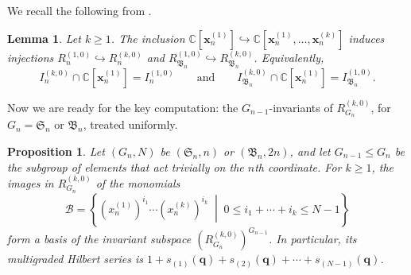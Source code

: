 \documentclass[12pt]{amsart}
\theoremstyle{plain}
\newtheorem{proposition}[theorem]{Proposition}
\newtheorem{lemma}[theorem]{Lemma}
\theoremstyle{definition}
\newcommand{\C}{\mathbb{C}}
\begin{document}
We recall the following from \cite[Lemma 3.1]{Lentfer-Supersymmetry}.
\begin{lemma}\label{lem:one-set-subring}
    Let $k \geq 1$.
    The inclusion $\C[\bm{x}^{(1)}_n] \hookrightarrow \C[\bm{x}^{(1)}_n, \ldots, \bm{x}^{(k)}_n]$ induces injections $R_n^{(1,0)} \hookrightarrow R_n^{(k,0)}$ and $R_{\mathfrak{B}_n}^{(1,0)} \hookrightarrow R_{\mathfrak{B}_n}^{(k,0)}$.
    Equivalently,
    \begin{equation}
        I_n^{(k,0)} \cap \C[\bm{x}^{(1)}_n] = I_n^{(1,0)}
        \qquad \text{and} \qquad
        I_{\mathfrak{B}_n}^{(k,0)} \cap \C[\bm{x}^{(1)}_n]
        = I_{\mathfrak{B}_n}^{(1,0)}.
    \end{equation}
\end{lemma}

Now we are ready for the key computation: the $G_{n-1}$-invariants of $R_{G_n}^{(k,0)}$, for $G_n = \mathfrak{S}_n$ or $\mathfrak{B}_n$, treated uniformly.

\begin{proposition}\label{prop:parabolic-invariants}
    Let $(G_n, N)$ be $(\mathfrak{S}_n, n)$ or $(\mathfrak{B}_n, 2n)$, and let $G_{n-1} \leq G_n$ be the subgroup of elements that act trivially on the $n$th coordinate.
    For $k \geq 1$, the images in $R_{G_n}^{(k,0)}$ of the monomials
    \begin{equation}\label{eq:basis}
        \mathcal{B} = \left\{(x^{(1)}_n)^{i_1}\cdots(x^{(k)}_n)^{i_k} \;\middle|\;
        0 \leq i_1+\cdots+i_k \leq N-1\right\}
    \end{equation}
    form a basis of the invariant subspace $(R_{G_n}^{(k,0)})^{G_{n-1}}$.
    In particular, its multigraded Hilbert series is $1 + s_{(1)}(\mathbf{q}) + s_{(2)}(\mathbf{q}) + \cdots + s_{(N-1)}(\mathbf{q})$.
\end{proposition}
\end{document}
